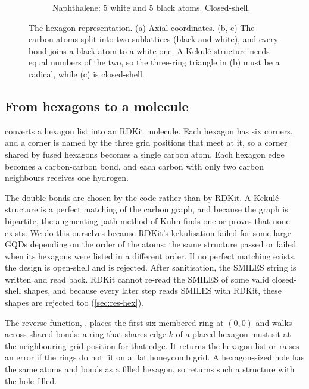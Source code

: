 \begin{figure}[ht]
\begin{subfigure}[b]{0.30\textwidth}
    \caption{Naphthalene: 5 white and 5 black atoms. Closed-shell.}
  \end{subfigure}
  \caption{The hexagon representation. (a) Axial coordinates. (b, c) The carbon atoms split into
           two sublattices (black and white), and every bond joins a black atom to a white one. A
           Kekul\'e structure needs equal numbers of the two, so the three-ring triangle in (b)
           must be a radical, while (c) is closed-shell.}
  \label{fig:hexgrid}
\end{figure}

\subsection{From hexagons to a molecule}

 converts a hexagon list into an RDKit molecule. Each hexagon has six corners,
and a corner is named by the three grid positions that meet at it, so a corner shared by fused
hexagons becomes a single carbon atom. Each hexagon edge becomes a carbon-carbon bond, and each
carbon with only two carbon neighbours receives one hydrogen.

The double bonds are chosen by the code rather than by RDKit. A Kekul\'e structure is a perfect
matching of the carbon graph, and because the graph is bipartite, the augmenting-path method of
Kuhn \cite{kuhn1955hungarian} finds one or proves that none exists. We do this ourselves because
RDKit's kekulisation failed for some large GQDs depending on the order of the atoms: the same
structure passed or failed when its hexagons were listed in a different order. If no perfect
matching exists, the design is open-shell and is rejected. After sanitisation, the SMILES string
is written and read back. RDKit cannot re-read the SMILES of some valid closed-shell shapes, and
because every later step reads SMILES with RDKit, these shapes are rejected too
(\cref{sec:res-hex}).

The reverse function, , places the first six-membered ring at \((0,0)\) and
walks across shared bonds: a ring that shares edge \(k\) of a placed hexagon must sit at the
neighbouring grid position for that edge. It returns the hexagon list or raises an error if the
rings do not fit on a flat honeycomb grid. A hexagon-sized hole has the same atoms and bonds as a
filled hexagon, so  returns such a structure with the hole filled.

